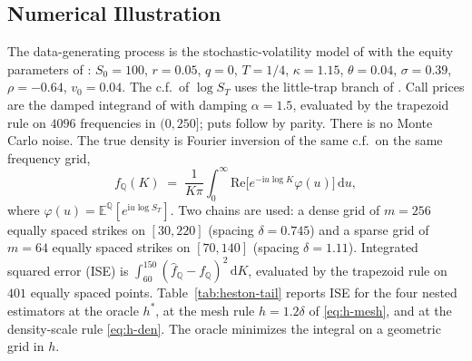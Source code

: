 \documentclass[preprint,12pt,authoryear,times]{elsarticle}
\newcommand{\E}{\mathbb{E}}
\newcommand{\Q}{\mathbb{Q}}
\begin{document}
\subsection{Numerical Illustration}
\label{sec:heston}

The data-generating process is the stochastic-volatility model of \citet{heston1993} with the equity parameters of \citet{bakshi1997}: \(S_0=100\), \(r=0.05\), \(q=0\), \(T=1/4\), \(\kappa=1.15\), \(\theta=0.04\), \(\sigma=0.39\), \(\rho=-0.64\), \(v_0=0.04\). The c.f.\ of \(\log S_T\) uses the little-trap branch of \citet{albrecher2007}. Call prices are the damped integrand of \citet{carrmadan1999} with damping \(\alpha=1.5\), evaluated by the trapezoid rule on \(4096\) frequencies in \((0,250]\); puts follow by parity. There is no Monte Carlo noise. The true density is Fourier inversion of the same c.f.\ on the same frequency grid,
\begin{equation}
\label{eq:true-q}
f_{\Q}(K)
\;=\;
\frac1{K\pi}\int_0^\infty
\mathrm{Re}\bigl[e^{-\mathrm{i}u\log K}\varphi(u)\bigr]\,\mathrm{d}u,
\end{equation}
where \(\varphi(u)=\E^{\Q}[e^{\mathrm{i}u\log S_T}]\). Two chains are used: a dense grid of \(m=256\) equally spaced strikes on \([30,220]\) (spacing \(\delta=0.745\)) and a sparse grid of \(m=64\) equally spaced strikes on \([70,140]\) (spacing \(\delta=1.11\)). Integrated squared error (ISE) is \(\int_{60}^{150}(\hat f_{\Q}-f_{\Q})^2\,\mathrm{d}K\), evaluated by the trapezoid rule on \(401\) equally spaced points. Table~\ref{tab:heston-tail} reports ISE for the four nested estimators at the oracle \(h^{\ast}\), at the mesh rule \(h=1.2\delta\) of \eqref{eq:h-mesh}, and at the density-scale rule \eqref{eq:h-den}. The oracle minimizes the integral on a geometric grid in \(h\).
\end{document}
